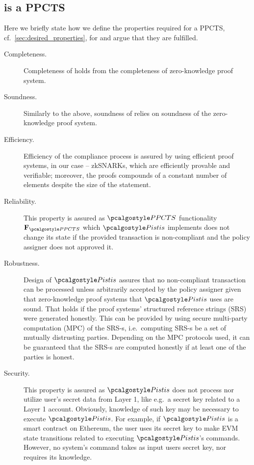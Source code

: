\documentclass[runningheads,10pt]{llncs}
\numberwithin{equation}{section}
\begin{document}
\subsection{\pistis{} is a PPCTS}
Here we briefly state how we define the properties required for a PPCTS,
cf.~\cref{sec:desired_properties}, for \pistis{} and argue that they are
fulfilled.

\begin{description}
\item[{Completeness.}] Completeness of \pistis{} holds from the completeness of
  zero-knowledge proof system.

\item[{Soundness.}] Similarly to the above, soundness of \pistis{} relies on
  soundness of the zero-knowledge proof system.

\item[{Efficiency.}] Efficiency of the compliance process is assured by using
  efficient proof systems, in our case -- zkSNARKs, which are efficiently
  provable and verifiable; moreover, the proofs compounds of a constant number
  of elements despite the size of the statement.

\item[{Reliability.}] This property is assured as $\PPCTS$ functionality
  $\func{\PPCTS}$ which $\pistis$ implements does not change its state if the
  provided transaction is non-compliant and the policy assigner does not
  approved it.

\item[{Robustness.}]
  Design of $\pistis$ assures that no non-compliant transaction can be processed
  unless arbitrarily accepted by the policy assigner given that zero-knowledge proof
  systems that $\pistis$ uses are sound. That holds if the proof systems' structured
  reference strings (SRS) were generated honestly. This can be provided by using
  secure multi-party computation (MPC) of the SRS-s, i.e.~computing SRS-s be a set of
  mutually distrusting parties. Depending on the MPC protocols used, it can be
  guaranteed that the SRS-s are computed honestly if at least one of the parties is
  honest.

\item[{Security.}]
  This property is assured as $\pistis$ does not process nor utilize user's secret data
  from Layer 1, like e.g.~a secret key related to a Layer 1 account.
%
  Obviously, knowledge of such key may be necessary to execute $\pistis$. For
  example, if $\pistis$ is a smart contract on Ethereum, the user uses its
  secret key to make EVM state transitions related to executing $\pistis$'s
  commands. However, no system's command takes as input users secret key, nor
  requires its knowledge.


\end{description}
\end{document}
